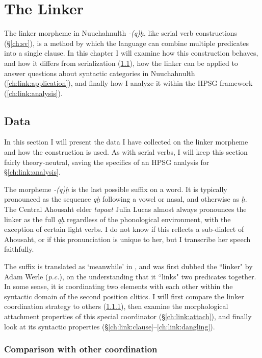 \chapter{The Linker} \label{ch:link}

The linker morpheme in Nuuchahnulth \textit{-(q)ḥ}, like serial verb constructions (\S\ref{ch:sv}), is a method by which the language can combine multiple predicates into a single clause. In this chapter I will examine how this construction behaves, and how it differs from serialization (\ref{ch:link:data}), how the linker can be applied to answer questions about syntactic categories in Nuuchahnulth (\ref{ch:link:application}), and finally how I analyze it within the HPSG framework (\ref{ch:link:analysis}).

\section{Data} \label{ch:link:data}

In this section I will present the data I have collected on the linker morpheme and how the construction is used. As with serial verbs, I will keep this section fairly theory-neutral, saving the specifics of an HPSG analysis for \S\ref{ch:link:analysis}.

The morpheme \textit{-(q)ḥ} is the last possible suffix on a word. It is typically pronounced as the sequence \textit{qḥ} following a vowel or nasal, and otherwise as \textit{ḥ}. The Central Ahousaht elder \textit{tupaat} Julia Lucas almost always pronounces the linker as the full \textit{qḥ} regardless of the phonological environment, with the exception of certain light verbs. I do not know if this reflects a sub-dialect of Ahousaht, or if this pronunciation is unique to her, but I transcribe her speech faithfully.

The suffix is translated as `meanwhile' in \cite{sapir1939}, and was first dubbed the ``linker" by Adam Werle (\textit{p.c.}), on the understanding that it ``links" two predicates together. In some sense, it is coordinating two elements with each other within the syntactic domain of the second position clitics. I will first compare the linker coordination strategy to others (\ref{ch:link:others}), then examine the morphological attachment properties of this special coordinator (\S\ref{ch:link:attach}), and finally look at its syntactic properties (\S\ref{ch:link:clause}--\ref{ch:link:dangling}).

\subsection{Comparison with other coordination} \label{ch:link:others}

